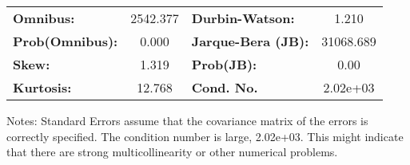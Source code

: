 \begin{table}[H]
  \centering
  \begin{tabular}{lclc}
    \toprule
    \textbf{Omnibus:}       & 2542.377 & \textbf{  Durbin-Watson:     } & 1.210     \\
    \textbf{Prob(Omnibus):} & 0.000    & \textbf{  Jarque-Bera (JB):  } & 31068.689 \\
    \textbf{Skew:}          & 1.319    & \textbf{  Prob(JB):          } & 0.00      \\
    \textbf{Kurtosis:}      & 12.768   & \textbf{  Cond. No.          } & 2.02e+03  \\
    \bottomrule
  \end{tabular}
\end{table}

Notes: \newline
[1] Standard Errors assume that the covariance matrix of the errors is correctly specified. \newline
[2] The condition number is large, 2.02e+03. This might indicate that there are \newline
strong multicollinearity or other numerical problems.

